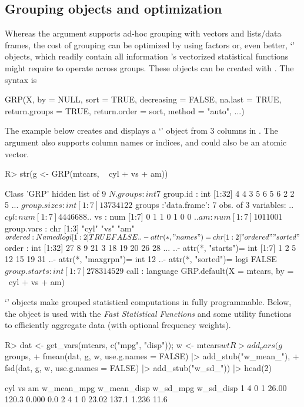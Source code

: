\documentclass[article]{jss}
\newcommand{\class}[1]{`\code{#1}'}
\begin{document}
\subsection{Grouping objects and optimization}
%
Whereas the  argument supports ad-hoc grouping with vectors and lists/data frames, the cost of grouping can be optimized by using factors or, even better, \class{GRP} objects, which readily contain all information 's vectorized statistical functions might require to operate across groups. These objects can be created with . The syntax is
 \begin{Code}
 GRP(X, by = NULL, sort = TRUE, decreasing = FALSE, na.last = TRUE,
     return.groups = TRUE, return.order = sort, method = "auto", ...)
 \end{Code}
 The example below creates and displays a \class{GRP} object from 3 columns in . The  argument also supports column names or indices, and  could also be an atomic vector.
%
\begin{Schunk}
\begin{Sinput}
R> str(g <- GRP(mtcars, ~ cyl + vs + am))
\end{Sinput}
\begin{Soutput}
Class 'GRP'  hidden list of 9
 $ N.groups    : int 7
 $ group.id    : int [1:32] 4 4 3 5 6 5 6 2 2 5 ...
 $ group.sizes : int [1:7] 1 3 7 3 4 12 2
 $ groups      :'data.frame':	7 obs. of  3 variables:
  ..$ cyl: num [1:7] 4 4 4 6 6 8 8
  ..$ vs : num [1:7] 0 1 1 0 1 0 0
  ..$ am : num [1:7] 1 0 1 1 0 0 1
 $ group.vars  : chr [1:3] "cyl" "vs" "am"
 $ ordered     : Named logi [1:2] TRUE FALSE
  ..- attr(*, "names")= chr [1:2] "ordered" "sorted"
 $ order       : int [1:32] 27 8 9 21 3 18 19 20 26 28 ...
  ..- attr(*, "starts")= int [1:7] 1 2 5 12 15 19 31
  ..- attr(*, "maxgrpn")= int 12
  ..- attr(*, "sorted")= logi FALSE
 $ group.starts: int [1:7] 27 8 3 1 4 5 29
 $ call        : language GRP.default(X = mtcars, by = ~cyl + vs + am)
\end{Soutput}
\end{Schunk}
%
\class{GRP} objects make grouped statistical computations in  fully programmable. Below, the object is used with the \emph{Fast Statistical Functions} and some utility functions to efficiently aggregate data (with optional frequency weights).
%
\begin{Schunk}
\begin{Sinput}
R> dat <- get_vars(mtcars, c("mpg", "disp")); w <- mtcars$wt
R> add_vars(g$groups,
+    fmean(dat, g, w, use.g.names = FALSE) |> add_stub("w_mean_"),
+    fsd(dat, g, w, use.g.names = FALSE) |> add_stub("w_sd_")) |> head(2)
\end{Sinput}
\begin{Soutput}
  cyl vs am w_mean_mpg w_mean_disp w_sd_mpg w_sd_disp
1   4  0  1      26.00       120.3    0.000       0.0
2   4  1  0      23.02       137.1    1.236      11.6
\end{Soutput}
\end{Schunk}
\end{document}
